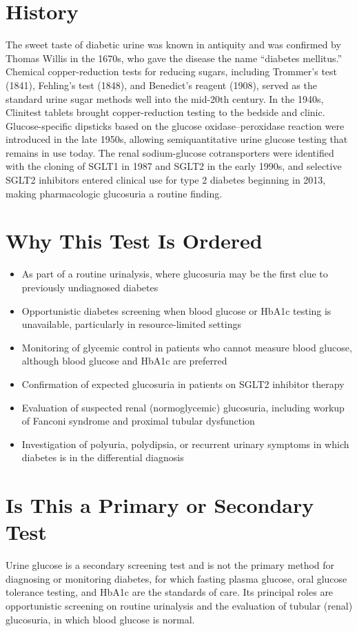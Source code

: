 \section*{History}
The sweet taste of diabetic urine was known in antiquity and was confirmed by Thomas Willis in the 1670s, who gave the disease the name ``diabetes mellitus.'' Chemical copper-reduction tests for reducing sugars, including Trommer's test (1841), Fehling's test (1848), and Benedict's reagent (1908), served as the standard urine sugar methods well into the mid-20th century. In the 1940s, Clinitest tablets brought copper-reduction testing to the bedside and clinic. Glucose-specific dipsticks based on the glucose oxidase--peroxidase reaction were introduced in the late 1950s, allowing semiquantitative urine glucose testing that remains in use today. The renal sodium-glucose cotransporters were identified with the cloning of SGLT1 in 1987 and SGLT2 in the early 1990s, and selective SGLT2 inhibitors entered clinical use for type 2 diabetes beginning in 2013, making pharmacologic glucosuria a routine finding.
\section*{Why This Test Is Ordered}
\begin{itemize}
  \item As part of a routine urinalysis, where glucosuria may be the first clue to previously undiagnosed diabetes
  \item Opportunistic diabetes screening when blood glucose or HbA1c testing is unavailable, particularly in resource-limited settings
  \item Monitoring of glycemic control in patients who cannot measure blood glucose, although blood glucose and HbA1c are preferred
  \item Confirmation of expected glucosuria in patients on SGLT2 inhibitor therapy
  \item Evaluation of suspected renal (normoglycemic) glucosuria, including workup of Fanconi syndrome and proximal tubular dysfunction
  \item Investigation of polyuria, polydipsia, or recurrent urinary symptoms in which diabetes is in the differential diagnosis
\end{itemize}
\section*{Is This a Primary or Secondary Test}
Urine glucose is a secondary screening test and is not the primary method for diagnosing or monitoring diabetes, for which fasting plasma glucose, oral glucose tolerance testing, and HbA1c are the standards of care. Its principal roles are opportunistic screening on routine urinalysis and the evaluation of tubular (renal) glucosuria, in which blood glucose is normal.
